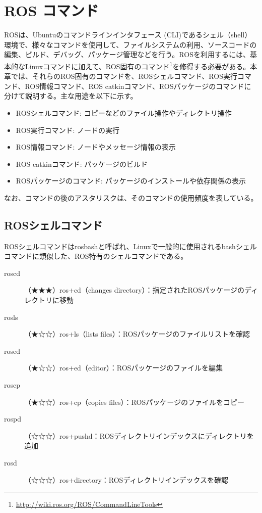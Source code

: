 
\chapter{ROS コマンド}

ROSは、Ubuntuのコマンドラインインタフェース (CLI)であるシェル（shell）環境で、様々なコマンドを使用して、ファイルシステムの利用、ソースコードの編集、ビルド、デバッグ、パッケージ管理などを行う。ROSを利用するには、基本的なLinuxコマンドに加えて、ROS固有のコマンド\footnote{\url{http://wiki.ros.org/ROS/CommandLineTools}}を修得する必要がある。本章では、それらのROS固有のコマンドを、ROSシェルコマンド、ROS実行コマンド、ROS情報コマンド、ROS catkinコマンド、ROSパッケージのコマンドに分けて説明する。主な用途を以下に示す。\\

\begin{itemize}
\item ROSシェルコマンド: コピーなどのファイル操作やディレクトリ操作
\item ROS実行コマンド: ノードの実行
\item ROS情報コマンド: ノードやメッセージ情報の表示
\item ROS catkinコマンド: パッケージのビルド
\item ROSパッケージのコマンド: パッケージのインストールや依存関係の表示\\
\end{itemize}

なお、コマンドの後のアスタリスクは、そのコマンドの使用頻度を表している。

\section{ROSシェルコマンド}

ROSシェルコマンドはrosbashと呼ばれ、Linuxで一般的に使用されるbashシェルコマンドに類似した、ROS特有のシェルコマンドである。

\vspace{\baselineskip}
\noindent
\begin{description}
\item[roscd]（★★★）ros+cd（changes directory）：指定されたROSパッケージのディレクトリに移動
\item[rosls] （★☆☆）ros+ls（lists files）：ROSパッケージのファイルリストを確認
\item[rosed]（★☆☆）ros+ed（editor）：ROSパッケージのファイルを編集
\item[roscp] （★☆☆）ros+cp（copies files）：ROSパッケージのファイルをコピー
\item[rospd]（☆☆☆）ros+pushd：ROSディレクトリインデックスにディレクトリを追加
\item[rosd]（☆☆☆）ros+directory：ROSディレクトリインデックスを確認\\
\end{description}

